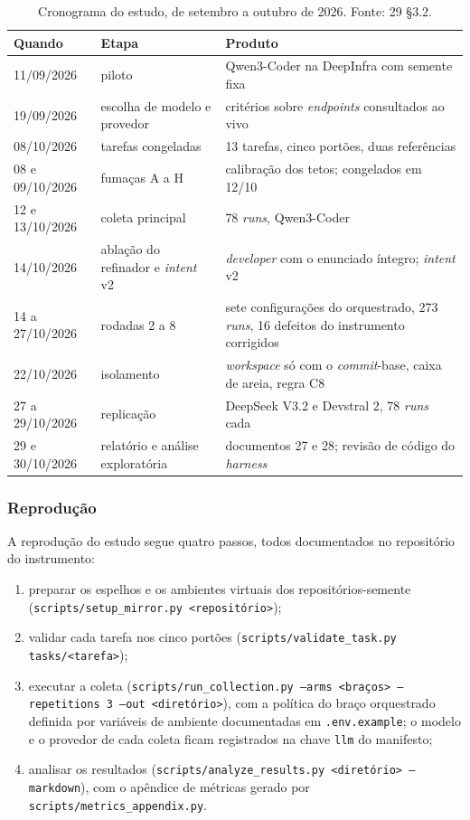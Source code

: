 \begin{table}[t]
\centering
\caption{Cronograma do estudo, de setembro a outubro de 2026. Fonte: 29 \S3.2.}
\label{tab-cronograma}
\small
\begin{tabular}{p{3.0cm}p{5.0cm}p{7.6cm}}
\toprule
Quando & Etapa & Produto \\
\midrule
11/09/2026 & piloto & Qwen3-Coder na DeepInfra com semente fixa \\
19/09/2026 & escolha de modelo e provedor & critérios sobre \textit{endpoints} consultados ao vivo \\
08/10/2026 & tarefas congeladas & 13 tarefas, cinco portões, duas referências \\
08 e 09/10/2026 & fumaças A a H & calibração dos tetos; congelados em 12/10 \\
12 e 13/10/2026 & coleta principal & 78 \textit{runs}, Qwen3-Coder \\
14/10/2026 & ablação do refinador e \textit{intent} v2 & \textit{developer} com o enunciado íntegro; \textit{intent} v2 \\
14 a 27/10/2026 & rodadas 2 a 8 & sete configurações do orquestrado, 273 \textit{runs}, 16 defeitos do instrumento corrigidos \\
22/10/2026 & isolamento & \textit{workspace} só com o \textit{commit}-base, caixa de areia, regra C8 \\
27 a 29/10/2026 & replicação & DeepSeek V3.2 e Devstral 2, 78 \textit{runs} cada \\
29 e 30/10/2026 & relatório e análise exploratória & documentos 27 e 28; revisão de código do \textit{harness} \\
\bottomrule
\end{tabular}
\end{table}

\subsubsection{Reprodução}

A reprodução do estudo segue quatro passos, todos documentados no repositório do instrumento:

\begin{enumerate}
    \item preparar os espelhos e os ambientes virtuais dos repositórios-semente (\texttt{scripts/setup\_mirror.py <repositório>});
    \item validar cada tarefa nos cinco portões (\texttt{scripts/validate\_task.py tasks/<tarefa>});
    \item executar a coleta (\texttt{scripts/run\_collection.py --arms <braços> --repetitions 3 --out <diretório>}), com a política do braço orquestrado definida por variáveis de ambiente documentadas em \texttt{.env.example}; o modelo e o provedor de cada coleta ficam registrados na chave \texttt{llm} do manifesto;
    \item analisar os resultados (\texttt{scripts/analyze\_results.py <diretório> --markdown}), com o apêndice de métricas gerado por \texttt{scripts/metrics\_appendix.py}.
\end{enumerate}

